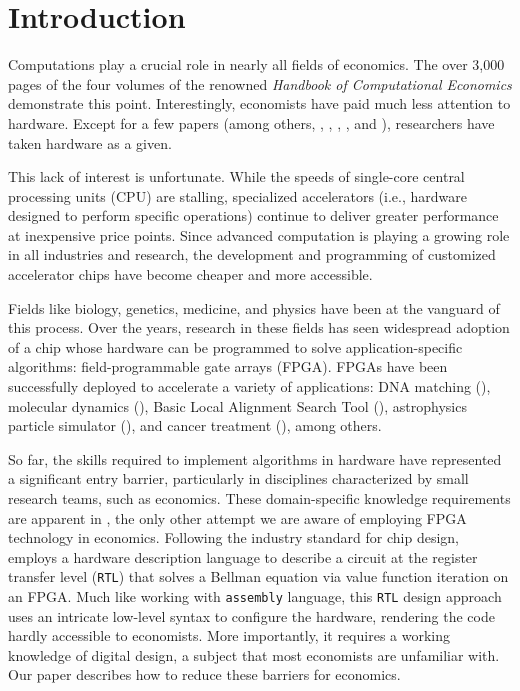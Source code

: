 \documentclass[12pt,american]{article}
\begin{document}
\newpage

\section{Introduction}\label{sec:int}

Computations play a crucial role in nearly all fields of economics. The over 3,000 pages of the four volumes of the renowned \textit{Handbook of Computational Economics} \citep{Handbook2018} demonstrate this point. Interestingly, economists have paid much less attention to hardware. Except for a few papers (among others, \citealp{Nagurney1996}, \citealp{Aldrich2011}, \citealp{FV2018}, \citealp{Duarte2019}, and \citealp{Peri2020}), researchers have taken hardware as a given.

This lack of interest is unfortunate. While the speeds of single-core central processing units (CPU) are stalling, specialized accelerators (i.e., hardware designed to perform specific operations) continue to deliver greater performance at inexpensive price points. Since advanced computation is playing a growing role in all industries and research, the development and programming of customized accelerator chips have become cheaper and more accessible.

Fields like biology, genetics, medicine, and physics have been at the vanguard of this process. Over the years, research in these fields has seen widespread adoption of a chip whose hardware can be programmed to solve application-specific algorithms: field-programmable gate arrays (FPGA). FPGAs have been successfully deployed to accelerate a variety of applications: DNA matching (\citealp{Hoang1993}), molecular dynamics (\citealp{AziziKuonEgierDarabihaChow2004}), Basic Local Alignment Search Tool (\citealp{HerbordtMartinModelJoshGuYongfengSukhwaniBharatVancourt2006}), astrophysics particle simulator (\citealp{BerczikMannerMarcusBanerkeKugelKlessenLienhar2009}), and cancer treatment (\citealp{SchultzLilgeBrownBetz2020}), among others.

So far, the skills required to implement algorithms in hardware have represented a significant entry barrier, particularly in disciplines characterized by small research teams, such as economics. These domain-specific knowledge requirements are apparent in \citet{Peri2020}, the only other attempt we are aware of employing FPGA technology in economics. Following the industry standard for chip design, \citet{Peri2020} employs 
a hardware description language to describe a circuit at the register transfer level (\texttt{RTL}) that solves a Bellman equation via value function iteration on an FPGA. Much like working with \texttt{assembly} language, this \texttt{RTL} design approach uses an intricate low-level syntax to configure the hardware, rendering the code hardly accessible to economists. More importantly, it requires a working knowledge of digital design, a subject that most economists are unfamiliar with. Our paper describes how to reduce these barriers for economics.
\end{document}
